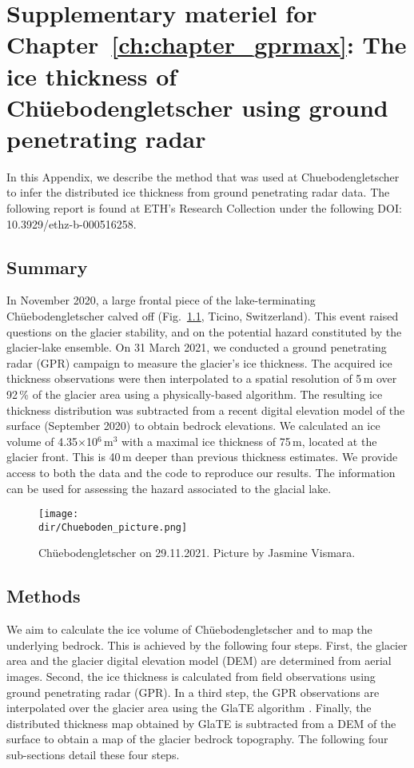 \chapter[The ice thickness of Chüebodengletscher]{Supplementary materiel for Chapter~\ref{ch:chapter_gprmax}: The ice thickness of Chüebodengletscher using ground penetrating radar}

\label{ch:chueboden}

In this Appendix, we describe the method that was used at Chuebodengletscher to infer the distributed ice thickness from ground penetrating radar data. The following report is found at ETH's Research Collection under the following DOI: 10.3929/ethz-b-000516258.

\section{Summary}

In November 2020, a large frontal piece of the lake-terminating Chüebodengletscher calved off (Fig.~\ref{fig:photo}, Ticino, Switzerland). This event raised questions on the glacier stability, and on the potential hazard constituted by the glacier-lake ensemble. 
On 31 March 2021, we conducted a ground penetrating radar (GPR) campaign to measure the glacier's ice thickness. The acquired ice thickness observations were then interpolated to a spatial resolution of 5\,m over 92\,\% of the glacier area using a physically-based algorithm. The resulting ice thickness distribution was subtracted from a recent digital elevation model of the surface (September 2020) to obtain bedrock elevations. We calculated an ice volume of 4.35$\times$10$^6$\,m$^3$ with a maximal ice thickness of 75\,m, located at the glacier front. This is 40\,m deeper than previous thickness estimates. We provide access to both the data and the code to reproduce our results. The information can be used for assessing the hazard associated to the glacial lake.  

\begin{figure}
\centering
\texttt{[image: \\dir/Chueboden\_picture.png]}
\caption{Chüebodengletscher on 29.11.2021. Picture by Jasmine Vismara.}
\label{fig:photo}
\end{figure}


\section{Methods}

We aim to calculate the ice volume of Chüebodengletscher and to map the underlying bedrock. This is achieved by the following four steps. First, the glacier area and the glacier digital elevation model (DEM) are determined from aerial images. Second, the ice thickness is calculated from field observations using ground penetrating radar (GPR). In a third step, the GPR observations are interpolated over the glacier area using the GlaTE algorithm \citep{Langhammer&al2019}. Finally, the distributed thickness map obtained by GlaTE is subtracted from a DEM of the surface to obtain a map of the glacier bedrock topography. The following four sub-sections detail these four steps.


